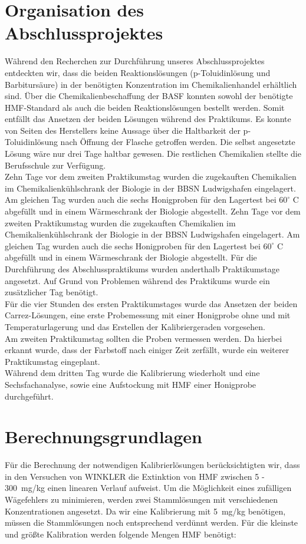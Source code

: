 \section{Organisation des Abschlussprojektes}
Während den Recherchen zur Durchführung unseres Abschlussprojektes entdeckten wir, dass die beiden Reaktionslösungen (p-Toluidinlösung und Barbitursäure) in der benötigten Konzentration im Chemikalienhandel erhältlich sind. Über die Chemikalienbeschaffung der BASF konnten sowohl der benötigte HMF-Standard als auch die beiden Reaktionslösungen bestellt werden. Somit entfällt das Ansetzen der beiden Lösungen während des Praktikums. Es konnte von Seiten des Herstellers keine Aussage über die Haltbarkeit der p-Toluidinlösung nach Öffnung der Flasche getroffen werden. Die selbst angesetzte Lösung wäre nur drei Tage haltbar gewesen. Die restlichen Chemikalien stellte die Berufsschule zur Verfügung. \\
Zehn Tage vor dem zweiten Praktikumstag wurden die zugekauften Chemikalien im Chemikalienkühlschrank der Biologie in der BBSN Ludwigshafen eingelagert. Am gleichen Tag wurden auch die sechs Honigproben für den Lagertest bei $60^\circ$ C abgefüllt und in einem Wärmeschrank der Biologie abgestellt.
Zehn Tage vor dem zweiten Praktikumstag wurden die zugekauften Chemikalien im Chemikalienkühlschrank der Biologie in der BBSN Ludwigshafen eingelagert. Am gleichen Tag wurden auch die sechs Honigproben für den Lagertest bei $60^\circ$ C abgefüllt und in einem Wärmeschrank der Biologie abgestellt.
Für die Durchführung des Abschlusspraktikums wurden anderthalb Praktikumstage angesetzt. Auf Grund von Problemen während des Praktikums wurde ein zusätzlicher Tag benötigt. \\
Für die vier Stunden des ersten Praktikumstages wurde das Ansetzen der beiden Carrez-Lösungen, eine erste Probemessung mit einer Honigprobe ohne und mit Temperaturlagerung und das Erstellen der Kalibriergeraden vorgesehen.\\
Am zweiten Praktikumstag sollten die Proben vermessen werden. Da hierbei erkannt wurde, dass der Farbstoff nach einiger Zeit zerfällt, wurde ein weiterer Praktikumstag eingeplant.\\
Während dem dritten Tag wurde die Kalibrierung wiederholt und eine Sechsfachanalyse, sowie eine Aufstockung mit HMF einer Honigprobe durchgeführt.\\

\section{Berechnungsgrundlagen}
Für die Berechnung der notwendigen Kalibrierlösungen berücksichtigten wir, dass in den Versuchen von WINKLER die Extinktion von HMF zwischen 5 - 300~mg/kg einen linearen Verlauf aufweist. Um die Möglichkeit eines zufälligen Wägefehlers zu minimieren, werden zwei Stammlösungen mit verschiedenen Konzentrationen angesetzt. Da wir eine Kalibrierung mit 5~mg/kg benötigen, müssen die Stammlösungen noch entsprechend verdünnt werden. Für die kleinste und größte Kalibration werden folgende Mengen HMF benötigt:

